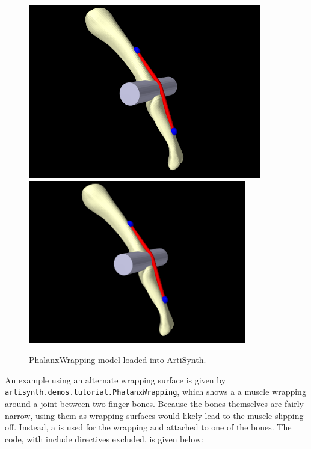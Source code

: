 \begin{figure}[t]
\begin{center}
\iflatexml
 \includegraphics[]{images/PhalanxWrapping}
\else
 \includegraphics[width=3.75in]{images/PhalanxWrapping}
\fi
\end{center}
\caption{PhalanxWrapping model loaded into ArtiSynth.}
\label{PhalanxWrapping:fig}
\end{figure}

An example using an alternate wrapping surface is given by {\tt
artisynth.demos.tutorial.PhalanxWrapping}, which shows a 
a muscle wrapping around a joint between two finger
bones. Because the bones themselves are fairly narrow, using them as
wrapping surfaces would likely lead to the muscle slipping
off. Instead, a  is used for the
wrapping and attached to one of the bones. The code, with include
directives excluded, is given below: \lstset{numbers=left} \iflatexml

\else

\fi
\lstset{numbers=none}

